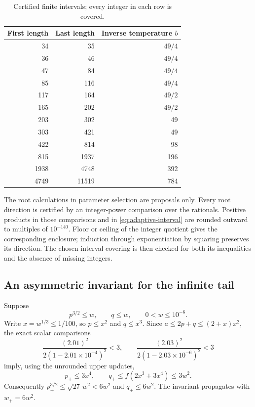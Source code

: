 \documentclass[11pt,a4paper]{article}
\begin{document}
\begin{table}[ht]
\centering
\caption{Certified finite intervals; every integer in each row is covered.}
\label{tab:adaptive}
\begin{tabular}{rrr}
\toprule
First length & Last length & Inverse temperature $b$\\
\midrule
34 & 35 & $49/4$\\
36 & 46 & $49/4$\\
47 & 84 & $49/4$\\
85 & 116 & $49/4$\\
117 & 164 & $49/2$\\
165 & 202 & $49/2$\\
203 & 302 & 49\\
303 & 421 & 49\\
422 & 814 & 98\\
815 & 1937 & 196\\
1938 & 4748 & 392\\
4749 & 11519 & 784\\
\bottomrule
\end{tabular}
\end{table}

The root calculations in parameter selection are proposals only.
Every root direction is certified by an integer-power comparison over
the rationals. Positive products in those comparisons and in
\eqref{eq:adaptive-interval} are rounded outward to multiples of
$10^{-140}$. Floor or ceiling of the integer quotient gives the
corresponding enclosure; induction through exponentiation by squaring
preserves its direction. The chosen interval covering is then checked
for both its inequalities and the absence of missing integers.

\subsection{An asymmetric invariant for the infinite tail}
Suppose
\begin{equation}\label{eq:adaptive-invariant}
 p^{3/2}\le w,\qquad q\le w,\qquad 0<w\le10^{-6}.
\end{equation}
Write $x=w^{1/3}\le1/100$, so $p\le x^2$ and $q\le x^3$.
Since $a\le2p+q\le(2+x)x^2$, the exact scalar comparisons
\[
 \frac{(2.01)^2}{2(1-2.01\times10^{-4})^2}<3,
 \qquad
 \frac{(2.03)^2}{2(1-2.03\times10^{-6})^2}<3
\]
imply, using the unrounded upper updates,
\[
 p_+\le3x^4,\qquad
 q_+\le f(2x^3+3x^4)\le3w^2.
\]
Consequently $p_+^{3/2}\le\sqrt{27}\,w^2<6w^2$ and
$q_+\le6w^2$. The invariant propagates with $w_+=6w^2$.
\end{document}
